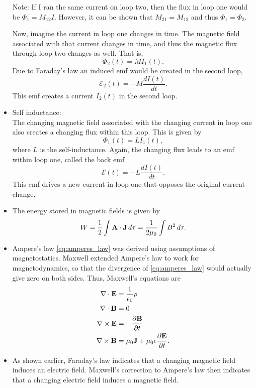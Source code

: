 \documentclass[oneside,a4paper,11pt]{report}
\begin{document}
\begin{itemize}
Note: If I ran the same current on loop two, then the flux in loop one would be $\Phi_1 = M_{12} I$. However, it can be shown that $M_{21} = M_{12}$ and thus $\Phi_1 = \Phi_2$.

Now, imagine the current in loop one changes in time. The magnetic field associated with that current changes in time, and thus the magnetic flux through loop two changes as well. That is,
\begin{equation}
\Phi_2(t) = M I_1(t).
\end{equation}
Due to Faraday's law an induced emf would be created in the second loop, \begin{equation}
\mathcal{E}_2(t) = - M \frac{d I(t)}{dt}.
\end{equation}
This emf creates a current $I_2(t)$ in the second loop.

\item Self inductance:\\
The changing magnetic field associated with the changing current in loop one also creates a changing flux within this loop. This is given by
\begin{equation}
\Phi_1(t) = L I_1(t),
\end{equation}
where $L$ is the self-inductance. Again, the changing flux leads to an emf within loop one, called the back emf
\begin{equation}
\mathcal{E}(t) = - L \frac{d I(t)}{dt}.
\end{equation}
This emf drives a new current in loop one that opposes the original current change.

\item The energy stored in magnetic fields is given by
\begin{equation}
W = \frac{1}{2} \int \mathbf{A} \cdot \mathbf{J} \, d\tau = \frac{1}{2\mu_0} \int B^2 \, d\tau.
\end{equation}

\item Ampere's law \cref{eq:amperes_law} was derived using assumptions of magnetostatics. Maxwell extended Ampere's law to work for magnetodynamics, so that the divergence of \cref{eq:amperes_law} would actually give zero on both sides. Thus, Maxwell's equations are
\begin{align}
\nabla \cdot \mathbf{E} &= \frac{1}{\epsilon_0} \rho \\
\nabla \cdot \mathbf{B} &= 0 \\
\nabla \times \mathbf{E} &= -\frac{ \partial \mathbf{B}}{\partial t} \\
\nabla \times \mathbf{B} &= \mu_0 \mathbf{J} + \mu_0 \epsilon \frac{\partial \mathbf{E}}{ \partial t}.
\end{align}

\item As shown earlier, Faraday's law indicates that a changing magnetic field induces an electric field. Maxwell's correction to Ampere's law then indicates that a changing electric field induces a magnetic field. 

\end{itemize}
\end{document}
